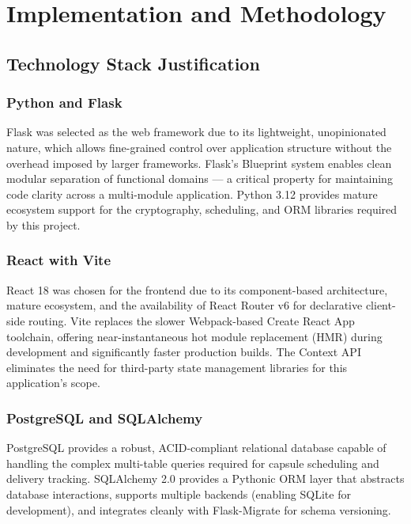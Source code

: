 \documentclass[12pt, a4paper]{article}
\begin{document}
\section{Implementation and Methodology}
\label{sec:implementation}

\subsection{Technology Stack Justification}

\subsubsection{Python and Flask}

Flask \cite{flask2024} was selected as the web framework due to its lightweight, unopinionated nature, which allows fine-grained control over application structure without the overhead imposed by larger frameworks. Flask's Blueprint system enables clean modular separation of functional domains — a critical property for maintaining code clarity across a multi-module application. Python 3.12 provides mature ecosystem support for the cryptography, scheduling, and ORM libraries required by this project.

\subsubsection{React with Vite}

React 18 \cite{react2024} was chosen for the frontend due to its component-based architecture, mature ecosystem, and the availability of React Router v6 for declarative client-side routing. Vite replaces the slower Webpack-based Create React App toolchain, offering near-instantaneous hot module replacement (HMR) during development and significantly faster production builds. The Context API eliminates the need for third-party state management libraries for this application's scope.

\subsubsection{PostgreSQL and SQLAlchemy}

PostgreSQL provides a robust, ACID-compliant relational database capable of handling the complex multi-table queries required for capsule scheduling and delivery tracking. SQLAlchemy 2.0 \cite{sqlalchemy2024} provides a Pythonic ORM layer that abstracts database interactions, supports multiple backends (enabling SQLite for development), and integrates cleanly with Flask-Migrate for schema versioning.
\end{document}
